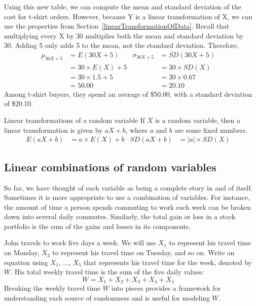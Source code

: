 \D{\newpage}

Using this new table, we can compute the mean and standard deviation of the cost for t-shirt orders. However, because Y is a linear transformation of X, we can use the properties from Section~\ref{linearTransformationOfData}. Recall that multiplying every X by 30 multiplies both the mean and standard deviation by 30. Adding 5 only adds 5 to the mean, not the standard deviation. Therefore,
\begin{align*}
\mu_{30X+5}&=E(30X+5) 
	& \sigma_{30X+5}&=SD(30X+5)\\
&= 30\times E(X) + 5
	& &= 30\times SD(X) \\
&= 30\times 1.5+5
	& &= 30 \times 0.67 \\
&= 50.00 
	& &= 20.10
\end{align*}
Among t-shirt buyers, they spend an average of \$50.00, with a standard deviation of \$20.10.

\begin{onebox}{Linear transformations of a random variable}
If $X$ is a random variable, then a linear transformation is given by $aX + b$, where $a$ and $b$ are some fixed numbers.
\begin{align*}
E(aX+b) &= a\times E(X) + b
&
SD(aX+b) &= \lvert a\rvert \times SD(X)
\end{align*}
\end{onebox}

\subsection{Linear combinations of random variables}
\label{lincomb}

So far, we have thought of each variable as being a complete story in and of itself. Sometimes it is more appropriate to use a combination of variables. For instance, the amount of time a person spends commuting to work each week can be broken down into several daily commutes. Similarly, the total gain or loss in a stock portfolio is the sum of the gains and losses in its components.

\begin{examplewrap}
\begin{nexample}{John travels to work five days a week. We will use $X_1$ to represent his travel time on Monday, $X_2$ to represent his travel time on Tuesday, and so on. Write an equation using $X_1$, ..., $X_5$ that represents his travel time for the week, denoted by $W$.}
His total weekly travel time is the sum of the five daily values:
$$ W = X_1 + X_2 + X_3 + X_4 + X_5 $$
Breaking the weekly travel time $W$ into pieces provides a framework for understanding each source of randomness and is useful for modeling $W$.
\end{nexample}
\end{examplewrap}

